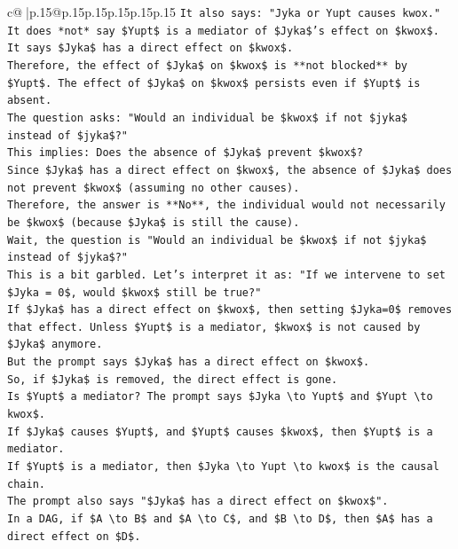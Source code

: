 \documentclass{article}
\begin{document}
{\begin{supertabular}{c@{$\;$}|p{.15\linewidth}@{}p{.15\linewidth}p{.15\linewidth}p{.15\linewidth}p{.15\linewidth}p{.15\linewidth}}
{{{\texttt{It also says: "Jyka or Yupt causes kwox."} \\
\texttt{It does *not* say \$Yupt\$ is a mediator of \$Jyka\$'s effect on \$kwox\$. It says \$Jyka\$ has a direct effect on \$kwox\$.} \\
\texttt{Therefore, the effect of \$Jyka\$ on \$kwox\$ is **not blocked** by \$Yupt\$. The effect of \$Jyka\$ on \$kwox\$ persists even if \$Yupt\$ is absent.} \\
\texttt{The question asks: "Would an individual be \$kwox\$ if not \$jyka\$ instead of \$jyka\$?"} \\
\texttt{This implies: Does the absence of \$Jyka\$ prevent \$kwox\$?} \\
\texttt{Since \$Jyka\$ has a direct effect on \$kwox\$, the absence of \$Jyka\$ does not prevent \$kwox\$ (assuming no other causes).} \\
\texttt{Therefore, the answer is **No**, the individual would not necessarily be \$kwox\$ (because \$Jyka\$ is still the cause).} \\
\texttt{Wait, the question is "Would an individual be \$kwox\$ if not \$jyka\$ instead of \$jyka\$?"} \\
\texttt{This is a bit garbled. Let's interpret it as: "If we intervene to set \$Jyka = 0\$, would \$kwox\$ still be true?"} \\
\texttt{If \$Jyka\$ has a direct effect on \$kwox\$, then setting \$Jyka=0\$ removes that effect. Unless \$Yupt\$ is a mediator, \$kwox\$ is not caused by \$Jyka\$ anymore.} \\
\texttt{But the prompt says \$Jyka\$ has a direct effect on \$kwox\$.} \\
\texttt{So, if \$Jyka\$ is removed, the direct effect is gone.} \\
\texttt{Is \$Yupt\$ a mediator? The prompt says \$Jyka \textbackslash{}to Yupt\$ and \$Yupt \textbackslash{}to kwox\$.} \\
\texttt{If \$Jyka\$ causes \$Yupt\$, and \$Yupt\$ causes \$kwox\$, then \$Yupt\$ is a mediator.} \\
\texttt{If \$Yupt\$ is a mediator, then \$Jyka \textbackslash{}to Yupt \textbackslash{}to kwox\$ is the causal chain.} \\
\texttt{The prompt also says "\$Jyka\$ has a direct effect on \$kwox\$".} \\
\texttt{In a DAG, if \$A \textbackslash{}to B\$ and \$A \textbackslash{}to C\$, and \$B \textbackslash{}to D\$, then \$A\$ has a direct effect on \$D\$.} \\
}}}
\end{supertabular}}
\end{document}
